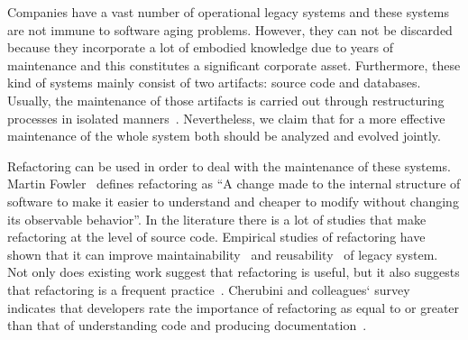 Companies have a vast number of operational legacy systems and these systems are not immune to software aging problems. However, they can not be discarded because they incorporate a lot of embodied knowledge due to years of maintenance and this constitutes a significant corporate asset. Furthermore, these kind of systems mainly consist of two artifacts: source code and databases. Usually, the maintenance of those artifacts is carried out through restructuring processes in isolated manners~\cite{Moser:2006}. Nevertheless, we claim that for a more effective maintenance of the whole system both should be analyzed and evolved jointly. 

Refactoring can be used in order to deal with the maintenance of these systems. Martin Fowler~\cite{refactImpro} defines refactoring as ``A change made to the internal structure of software to make it easier to understand and cheaper to modify without changing its observable behavior''. In the literature there is a lot of studies that make refactoring at the level of source code. Empirical studies of refactoring have shown that it can improve maintainability~\cite{1510132} and reusability~\cite{Moser:2006} of legacy system. Not only does existing work suggest that refactoring is useful, but it also suggests that refactoring is a frequent practice~\cite{Murphy:2011}. Cherubini and colleagues` survey indicates that developers rate the importance of refactoring as equal to or greater than that of understanding code and producing documentation~\cite{Cherubini:2007}.

